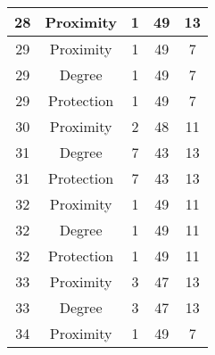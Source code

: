 \documentclass[results.tex]{subfiles}
\begin{document}
\begin{center}
\begin{tabular}{| c || c | c | c | c |}
            \hline
            28                      & Proximity                    & 1                      & 49                      & 13                   \\
            \hline
            29                      & Proximity                    & 1                      & 49                      & 7                    \\
            \hline
            29                      & Degree                       & 1                      & 49                      & 7                    \\
            \hline
            29                      & Protection                   & 1                      & 49                      & 7                    \\
            \hline
            30                      & Proximity                    & 2                      & 48                      & 11                   \\
            \hline
            31                      & Degree                       & 7                      & 43                      & 13                   \\
            \hline
            31                      & Protection                   & 7                      & 43                      & 13                   \\
            \hline
            32                      & Proximity                    & 1                      & 49                      & 11                   \\
            \hline
            32                      & Degree                       & 1                      & 49                      & 11                   \\
            \hline
            32                      & Protection                   & 1                      & 49                      & 11                   \\
            \hline
            33                      & Proximity                    & 3                      & 47                      & 13                   \\
            \hline
            33                      & Degree                       & 3                      & 47                      & 13                   \\
            \hline
            34                      & Proximity                    & 1                      & 49                      & 7                    \\

\end{tabular}
\end{center}
\end{document}
